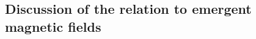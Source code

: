 \documentclass[
    aps,
    prb,
    twocolumn,
    floatfix,
    superscriptaddress,
	10pt
]{revtex4-2}
\begin{document}



\subsection{Discussion of the relation to emergent magnetic fields}
\end{document}
